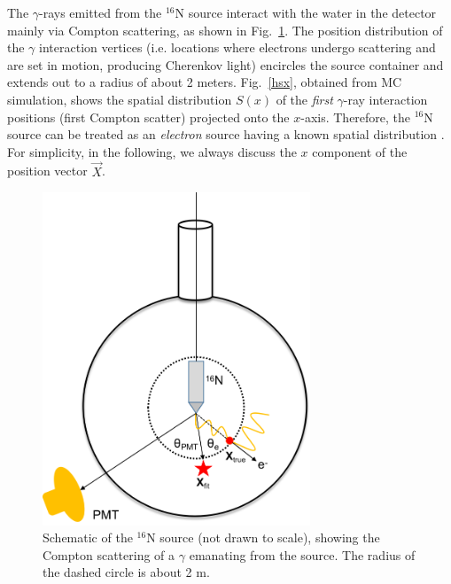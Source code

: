 The $\gamma$-rays emitted from the $^{16}$N source interact with the water in the detector mainly via Compton scattering, as shown in Fig.~\ref{N16centralDiagram}. The position distribution of the $\gamma$ interaction vertices (i.e. locations where electrons undergo scattering and are set in motion, producing Cherenkov light) encircles the source container and extends out to a radius of about 2 meters. Fig.~\ref{hsx}, obtained from MC simulation, shows the spatial distribution $S(x)$ of the {\em first} $\gamma$-ray interaction positions (first Compton scatter) projected onto the $x$-axis. Therefore, the $^{16}$N source can be treated as an {\em electron} source having a known spatial distribution \cite{boulay2004direct}. For simplicity, in the following, we always discuss the $x$ component of the position vector $\vec{X}$. 

\begin{figure}[!htb]
	\centering
	\includegraphics[width=8cm]{N16centralDiagram.png}
	\caption[Schematic of the $^{16}$N source.]{Schematic of the $^{16}$N source (not drawn to scale), showing the Compton scattering of a $\gamma$ emanating from the source. The radius of the dashed circle is about 2 m.	\label{N16centralDiagram}}
\end{figure}

